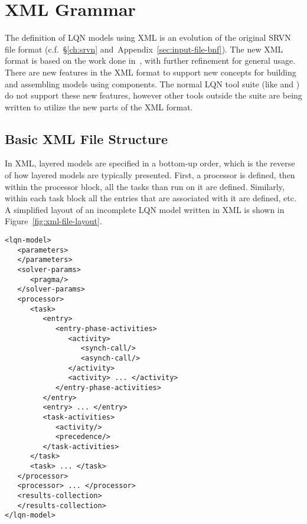 
\chapter{XML Grammar}
\label{sec:xml-grammar}

The definition of LQN models using XML is an evolution of
the original SRVN file format (c.f.~\S\ref{ch:srvn} and~Appendix~\ref{sec:input-file-bnf}).  The
new XML format is based on the work done in~\cite{perf:wu-2003}, with
further refinement for general usage.  There are new features in the
XML format to support new concepts for building and assembling models
using components.  The normal LQN tool suite (like
 and ) do not support these new
features, however other tools outside the suite are being written to
utilize the new parts of the XML format.

\section{Basic XML File Structure}
\label{sec:xml-file-structure}

In XML, layered models are specified in a bottom-up order, which is
the reverse of how layered models are typically presented.  First, a
processor is defined, then within the processor block, all the tasks
than run on it are defined.  Similarly, within each task block all the
entries that are associated with it are defined, etc.  A simplified
layout of an incomplete LQN model written in XML is shown in
Figure~\ref{fig:xml-file-layout}.

\lstset{language=XML,basicstyle=\ttfamily,numbersep=10pt}
\begin{lstlisting}[float,caption={XML file layout.},label=fig:xml-file-layout]
<lqn-model>
   <parameters>
   </parameters>
   <solver-params>
      <pragma/>
   </solver-params>
   <processor>
      <task>
         <entry>
            <entry-phase-activities>
               <activity>
                  <synch-call/>
                  <asynch-call/>
               </activity>
               <activity> ... </activity>
            </entry-phase-activities>
         </entry>
         <entry> ... </entry>
         <task-activities>
            <activity/>
            <precedence/>
         </task-activities>
      </task>
      <task> ... </task>
   </processor>
   <processor> ... </processor>
   <results-collection>
   </results-collection>
</lqn-model>
\end{lstlisting}

